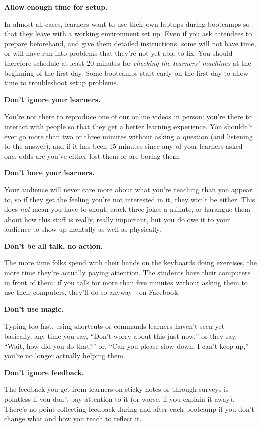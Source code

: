\documentclass[]{book}
\begin{document}
\textbf{Allow enough time for setup.}

In almost all cases, learners want to use their own laptops during
bootcamps so that they leave with a working environment set up. Even if
you ask attendees to prepare beforehand, and give them detailed
instructions, some will not have time, or will have run into problems
that they're not yet able to fix. You should therefore schedule at least
20 minutes for \emph{checking the learners' machines} at the beginning
of the first day. Some bootcamps start early on the first day to allow
time to troubleshoot setup problems.

\textbf{Don't ignore your learners.}

You're not there to reproduce one of our online videos in person: you're
there to interact with people so that they get a better learning
experience. You shouldn't ever go more than two or three minutes without
asking a question (and listening to the answer), and if it has been 15
minutes since any of your learners asked one, odds are you've either
lost them or are boring them.

\textbf{Don't bore your learners.}

Your audience will never care more about what you're teaching than you
appear to, so if they get the feeling you're not interested in it, they
won't be either. This does \emph{not} mean you have to shout, crack
three jokes a minute, or harangue them about how this stuff is really,
really important, but you do owe it to your audience to show up mentally
as well as physically.

\textbf{Don't be all talk, no action.}

The more time folks spend with their hands on the keyboards doing
exercises, the more time they're actually paying attention. The students
have their computers in front of them: if you talk for more than five
minutes without asking them to use their computers, they'll do so
anyway---on Facebook.

\textbf{Don't use magic.}

Typing too fast, using shortcuts or commands learners haven't seen
yet---basically, any time you say, ``Don't worry about this just now,''
or they say, ``Wait, how did you do that?'' or, ``Can you please slow
down, I can't keep up,'' you're no longer actually helping them.

\textbf{Don't ignore feedback.}

The feedback you get from learners on sticky notes or through surveys is
pointless if you don't pay attention to it (or worse, if you explain it
away). There's no point collecting feedback during and after each
bootcamp if you don't change what and how you teach to reflect it.
\end{document}
